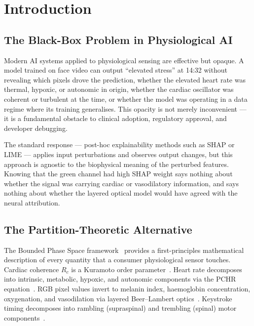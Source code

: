 \documentclass[10pt,twocolumn,a4paper]{article}
\theoremstyle{definition}
\theoremstyle{remark}
\newcommand{\Rc}{R_c}
\begin{document}
\section{Introduction}
\label{sec:intro}

\subsection{The Black-Box Problem in Physiological AI}

Modern AI systems applied to physiological sensing are effective but
opaque.  A model trained on face video can output ``elevated stress'' at
14:32 without revealing which pixels drove the prediction, whether the
elevated heart rate was thermal, hypoxic, or autonomic in origin, whether
the cardiac oscillator was coherent or turbulent at the time, or whether
the model was operating in a data regime where its training generalises.
This opacity is not merely inconvenient --- it is a fundamental obstacle
to clinical adoption, regulatory approval, and developer debugging.

The standard response --- post-hoc explainability methods such as SHAP
or LIME --- applies input perturbations and observes output changes, but
this approach is agnostic to the biophysical meaning of the perturbed
features.  Knowing that the green channel had high SHAP weight says
nothing about whether the signal was carrying cardiac or vasodilatory
information, and says nothing about whether the layered optical model
would have agreed with the neural attribution.

\subsection{The Partition-Theoretic Alternative}

The Bounded Phase Space framework~\cite{sachikonye2024integration,
sachikonye2024fluid,sachikonye2024gas,sachikonye2024transport} provides
a first-principles mathematical description of every quantity that a
consumer physiological sensor touches.  Cardiac coherence $\Rc$ is a
Kuramoto order parameter~\cite{kuramoto1984}.  Heart rate decomposes into
intrinsic, metabolic, hypoxic, and autonomic components via the PCHR
equation~\cite{sachikonye2024disambiguation}.  RGB pixel values invert to
melanin index, haemoglobin concentration, oxygenation, and vasodilation
via layered Beer--Lambert optics~\cite{sachikonye2024optical}.  Keystroke
timing decomposes into rambling (supraspinal) and trembling (spinal)
motor components~\cite{sachikonye2024motor}.
\end{document}
